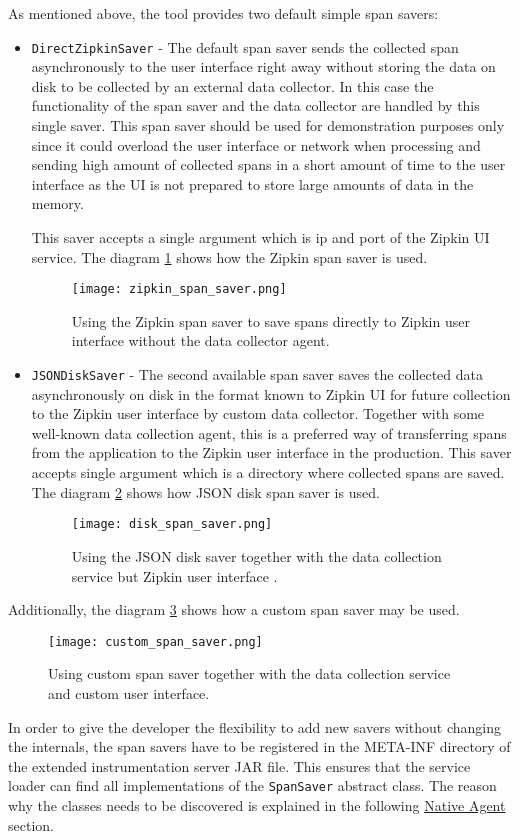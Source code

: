 As mentioned above, the tool provides two default simple span savers:
\begin{itemize}
	\item  \texttt{DirectZipkinSaver} - The default span saver sends the collected span asynchronously to the user interface right away without storing the data on disk to be collected by an external data collector. In this case the functionality of the span saver and the data collector are handled by this single saver. This span saver should be used for demonstration purposes only since it could overload the user interface or network when processing and sending high amount of collected spans in a short amount of time to the user interface as the UI is not prepared to store large amounts of data in the memory. 
	
	This saver accepts a single argument which is ip and port of the Zipkin UI service. The diagram \ref{fig:zipkin_span_saver} shows how the Zipkin span saver is used.
	
		\begin{figure}
			\centering
			\texttt{[image: zipkin\_span\_saver.png]}
			\caption{Using the Zipkin span saver to save spans directly to Zipkin user interface without the data collector agent.}
			\label{fig:zipkin_span_saver}
		\end{figure}
	\item  \texttt{JSONDiskSaver} - The second available span saver saves the collected data asynchronously on disk in the format known to Zipkin UI for future collection to the Zipkin user interface by custom data collector. Together with some well-known data collection agent, this is a preferred way of transferring spans from the application to the Zipkin user interface in the production. This saver accepts single argument which is a directory where collected spans are saved. The diagram \ref{fig:disk_span_saver} shows how JSON disk span saver is used.
	\begin{figure}
		\centering
		\texttt{[image: disk\_span\_saver.png]}
		\caption{Using the JSON disk saver together with the data collection service but Zipkin user interface .}
		\label{fig:disk_span_saver}
	\end{figure}
\end{itemize}
Additionally, the diagram \ref{fig:custom_span_saver} shows how a custom span saver may be used.

\begin{figure}
	\centering
	\texttt{[image: custom\_span\_saver.png]}
	\caption{Using custom span saver together with the data collection service and custom user interface.}
	\label{fig:custom_span_saver}
\end{figure}
In order to give the developer the flexibility to add new savers without changing the internals, the span savers have to be  registered in the META-INF directory of the extended instrumentation server JAR file. This ensures that the service loader can find all implementations of the \texttt{SpanSaver} abstract class. The reason why the classes needs to be discovered is explained in the following \hyperref[native_agent_design]{Native Agent} section. 

